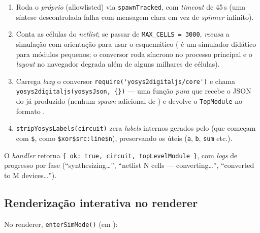 \begin{enumerate}[leftmargin=2.2em,start=3]
  \item Roda o \emph{próprio}  (allowlisted) via
        \lstinline|spawnTracked|, com \emph{timeout} de 45\,s (uma síntese
        descontrolada falha com mensagem clara em vez de \emph{spinner} infinito).
  \item Conta as células do \emph{netlist}; se passar de \lstinline|MAX_CELLS = 3000|,
        \emph{recusa} a simulação com orientação para usar o esquemático
        ( é um simulador didático para módulos pequenos; o
        conversor roda síncrono no processo principal e o \emph{layout} no
        navegador degrada além de alguns milhares de células).
  \item Carrega \emph{lazy} o conversor \lstinline|require('yosys2digitaljs/core')|
        e chama \lstinline|yosys2digitaljs(yosysJson, {})| --- uma função
        \emph{pura} que recebe o JSON do  já produzido (nenhum
        \emph{spawn} adicional de ) e devolve o \lstinline|TopModule|
        no formato .
  \item \lstinline|stripYosysLabels(circuit)| zera \emph{labels} internos
        gerados pelo  (que começam com \lstinline|$|, como
        \lstinline|$xor$src:line$n|), preservando os úteis (\lstinline|a|,
        \lstinline|b|, \lstinline|sum| etc.).
\end{enumerate}

O \emph{handler} retorna \lstinline|{ ok: true, circuit, topLevelModule }|, com
\emph{logs} de progresso por fase (\enquote{synthesizing\dots}, \enquote{netlist
N cells --- converting\dots}, \enquote{converted to M devices\dots}).

\subsection{Renderização interativa no renderer}

No renderer, \lstinline|enterSimMode()| (em ):

